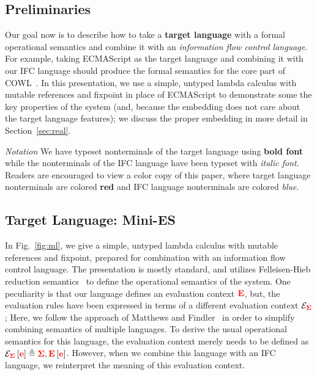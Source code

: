 \documentclass{llncs}
\begin{document}
\subsection{Preliminaries}

Our goal now is to
describe how to take a \textbf{{\color{red} target
language}} with a formal operational semantics and combine it with an
\textit{{\color{blue} information flow control language}}.  For example,
taking ECMAScript as the target language and combining it with our IFC
language should produce the formal semantics for the core part of COWL~\cite{swapi}.  In this
presentation, we use a simple, untyped lambda calculus with mutable
references and fixpoint in place of ECMAScript to demonstrate some the key
properties of the system (and, because the embedding does not care
about the target language features); we discuss the proper embedding
in more detail in Section~\ref{sec:real}.

\vspace{1pt}
\noindent
\textit{Notation}
We have typeset nonterminals of the target language using \textbf{{\color{red}
bold font}} while the nonterminals of the IFC language have been typeset
with \textit{{\color{blue} italic font}}.  Readers are encouraged to view
a color copy of this paper, where target language nonterminals are colored \textbf{{\color{red} red}}
and IFC language nonterminals are colored \textit{{\color{blue} blue}}.

\subsection{Target Language: Mini-ES}

In Fig.~\ref{fig:ml}, we give a simple, untyped lambda calculus with
mutable references and fixpoint, prepared for combination with an
information flow control language.  The presentation is mostly standard, and utilizes Felleisen-Hieb reduction
semantics~\cite{Felleisen:1992:RRS:136293.136297} to define the
operational semantics of the system.  One peculiarity is that our language
defines an evaluation context \ensuremath{\tar{E}}, but, the evaluation rules have been
expressed in terms of a different evaluation context \ensuremath{\mathcal{E}_{\tar{\Sigma}}};
Here, we follow the approach of Matthews and
Findler~\cite{Matthews:2007:OSM:1190216.1190220} in order to simplify combining
semantics of multiple languages.
To derive the usual operational semantics for this language, the evaluation
context merely needs to be defined as \ensuremath{\mathcal{E}_{\tar{\Sigma}}\left[\tar{e}\right]\triangleq{}\tar{\Sigma},\tar{E}\left[\tar{e}\right]}.
However, when we combine this language with an IFC language, we
reinterpret the meaning of this evaluation context.
\end{document}
